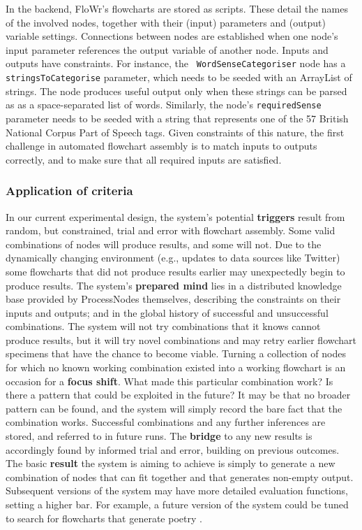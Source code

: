 In the backend, {\sf FloWr}'s flowcharts are stored as scripts.  These
detail the names of the involved nodes, together with their (input)
parameters and (output) variable settings.  Connections between nodes
are established when one node's input parameter references the output
variable of another node.
%
Inputs and outputs have constraints.  For instance, the {\tt
  WordSenseCategoriser} node has a {\tt stringsToCategorise}
parameter, which needs to be seeded with an ArrayList of strings.  The node produces useful output only when these strings can be parsed as as a space-separated list of words.  Similarly, the node's {\tt requiredSense} parameter needs to be seeded with a string that represents one of the 57 British National Corpus Part of Speech tags.  Given constraints of this nature, the first challenge in automated flowchart assembly is to match inputs to outputs correctly, and to make sure that all required inputs are satisfied.

\subsubsection{Application of criteria}

In our current experimental design, the system's potential
\textbf{triggers} result from random, but constrained, trial and error
with flowchart assembly.  Some valid combinations of nodes will
produce results, and some will not.  Due to the dynamically changing
environment (e.g., updates to data sources like Twitter) some
flowcharts that did not produce results earlier may unexpectedly begin
to produce results.
%
The system's \textbf{prepared mind} lies in a distributed knowledge
base provided by ProcessNodes themselves, describing the constraints
on their inputs and outputs; and in the global history of successful
and unsuccessful combinations.
%
The system will not try combinations that it knows cannot produce
results, but it will try novel combinations and may retry earlier
flowchart specimens that have the chance to become viable.  Turning a
collection of nodes for which no known working combination existed
into a working flowchart is an occasion for a \textbf{focus shift}.
What made this particular combination work?  Is there a pattern that
could be exploited in the future?  It may be that no broader pattern
can be found, and the system will simply record the bare fact that the
combination works.
%
Successful combinations and any further inferences are stored, and
referred to in future runs.  The \textbf{bridge} to any new
results is accordingly found by informed trial and error, building
on previous outcomes.
%
The basic \textbf{result} the system is aiming to achieve is simply to
generate a new combination of nodes that can fit together and that
generates non-empty output.  Subsequent versions of the system may
have more detailed evaluation functions, setting a higher bar.  For
example, a future version of the system could be tuned to search for
flowcharts that generate poetry \cite{corneli2015computational}.

